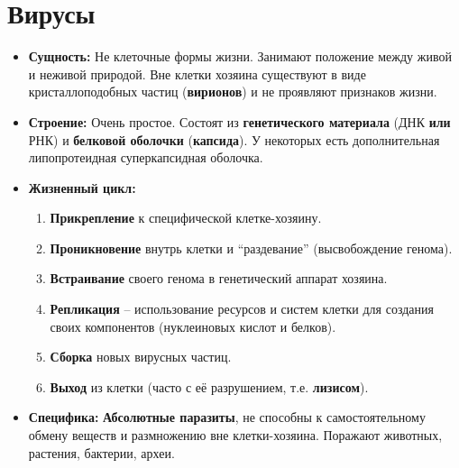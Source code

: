 \documentclass[12pt]{article}
\begin{document}
	\section{Вирусы}
	\begin{itemize}
		\item \textbf{Сущность:} Не клеточные формы жизни. Занимают положение между живой и неживой природой. Вне клетки хозяина существуют в виде кристаллоподобных частиц (\textbf{вирионов}) и не проявляют признаков жизни.
		\item \textbf{Строение:} Очень простое. Состоят из \textbf{генетического материала} (ДНК \textbf{или} РНК) и \textbf{белковой оболочки} (\textbf{капсида}). У некоторых есть дополнительная липопротеидная суперкапсидная оболочка.
		\item \textbf{Жизненный цикл:}
		\begin{enumerate}
			\item \textbf{Прикрепление} к специфической клетке-хозяину.
			\item \textbf{Проникновение} внутрь клетки и ``раздевание'' (высвобождение генома).
			\item \textbf{Встраивание} своего генома в генетический аппарат хозяина.
			\item \textbf{Репликация} -- использование ресурсов и систем клетки для создания своих компонентов (нуклеиновых кислот и белков).
			\item \textbf{Сборка} новых вирусных частиц.
			\item \textbf{Выход} из клетки (часто с её разрушением, т.е. \textbf{лизисом}).
		\end{enumerate}
		\item \textbf{Специфика:} \textbf{Абсолютные паразиты}, не способны к самостоятельному обмену веществ и размножению вне клетки-хозяина. Поражают животных, растения, бактерии, археи.
	\end{itemize}
\end{document}
